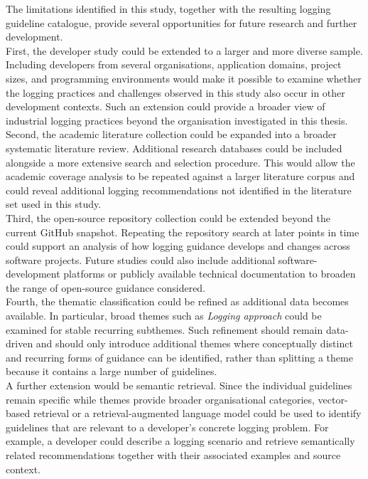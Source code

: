 The limitations identified in this study, together with the resulting logging
guideline catalogue, provide several opportunities for future research and further
development.
\\
First, the developer study could be extended to a larger and more diverse sample.
Including developers from several organisations, application domains, project sizes,
and programming environments would make it possible to examine whether the logging
practices and challenges observed in this study also occur in other development
contexts. Such an extension could provide a broader view of industrial logging
practices beyond the organisation investigated in this thesis.
\\
Second, the academic literature collection could be expanded into a broader systematic
literature review. Additional research databases could be included alongside a more 
extensive search and selection procedure. This would allow the academic coverage analysis to be repeated
against a larger literature corpus and could reveal additional logging recommendations
not identified in the literature set used in this study.
\\
Third, the open-source repository collection could be extended beyond the current
GitHub snapshot. Repeating the repository search at later points in time could support
an analysis of how logging guidance develops and changes across software
projects. Future studies could also include additional software-development platforms
or publicly available technical documentation to broaden the range of
open-source guidance considered.
\\
Fourth, the thematic classification could be refined as additional data becomes
available. In particular, broad themes such as \textit{Logging approach} could be
examined for stable recurring subthemes. Such refinement should remain data-driven
and should only introduce additional themes where conceptually distinct and recurring
forms of guidance can be identified, rather than splitting a theme because it
contains a large number of guidelines.
\\
A further extension would be semantic retrieval. Since the individual
guidelines remain specific while themes provide broader organisational categories,
vector-based retrieval or a retrieval-augmented language model could be used to
identify guidelines that are relevant to a developer's concrete logging problem. For
example, a developer could describe a logging scenario and retrieve semantically
related recommendations together with their associated examples and source context.
